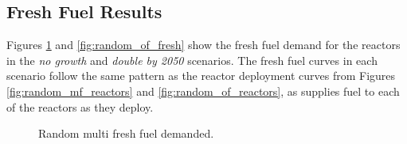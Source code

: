 \subsection{Fresh Fuel Results}
\label{sec:random_fresh}

Figures \ref{fig:random_mf_fresh} and \ref{fig:random_of_fresh} show the fresh fuel demand for the reactors in the \textit{no growth} and \textit{double by 2050} scenarios. The fresh fuel curves in each scenario follow the same pattern as the reactor deployment curves from Figures \ref{fig:random_mf_reactors} and \ref{fig:random_of_reactors}, as \cyclus supplies fuel to each of the reactors as they deploy.


\begin{figure}[H]
    \hfill
    \caption{Random multi fresh fuel demanded.}
    \label{fig:random_mf_fresh}
  \end{figure}



